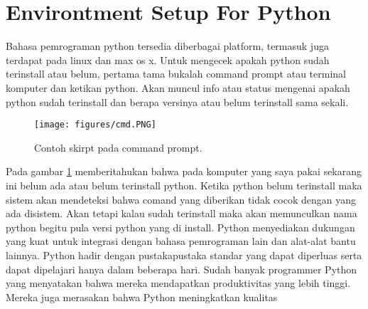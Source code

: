 \section{Environtment Setup For Python}
Bahasa pemrograman python tersedia diberbagai platform, termasuk juga terdapat pada 
linux dan max os x. Untuk mengecek apakah python sudah terinstall atau belum, pertama 
tama bukalah command prompt atau terminal komputer dan ketikan python. Akan muncul info 
atau status mengenai apakah python sudah terinstall dan berapa versinya atau belum terinstall sama sekali.
  \begin{figure}[ht]
	\centerline{\texttt{[image: figures/cmd.PNG]}}
	\caption{Contoh skirpt pada command prompt.}
	\label{cmd}
	\end{figure}
Pada gambar \ref{cmd} memberitahukan bahwa pada komputer yang saya pakai sekarang ini belum ada atau belum terinstall python.
Ketika python belum terinstall maka sistem akan mendeteksi bahwa comand yang diberikan tidak cocok dengan yang ada disistem. 
Akan tetapi kalau sudah terinstall maka akan memunculkan nama python begitu pula versi python yang di install.
Python menyediakan dukungan yang kuat untuk integrasi dengan bahasa pemrograman lain dan alat-alat bantu lainnya. 
Python hadir dengan pustakapustaka standar yang dapat diperluas serta dapat dipelajari hanya dalam beberapa hari.
Sudah banyak programmer Python yang menyatakan bahwa mereka mendapatkan produktivitas yang lebih tinggi. 
Mereka juga merasakan bahwa Python meningkatkan kualitas 

